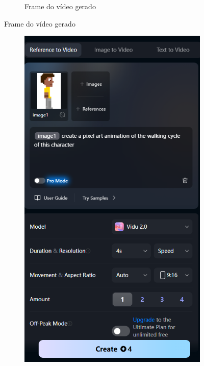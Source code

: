 \begin{figure}[htbp]
\begin{subfigure}{0.2\linewidth}
        \caption{\small Frame do vídeo gerado}
        \label{fig:vidu1f}
    \end{subfigure}
\end{figure}

\begin{figure}[htbp]
    \centering
    \caption{\small Processo da utilização 1 do Vidu em julho/2025}
    \label{fig:vidu2}
    \begin{subfigure}{0.4\linewidth}
        \includegraphics[width=1\linewidth]{figs/vidu/tela3.PNG}

\end{subfigure}
\end{figure}
